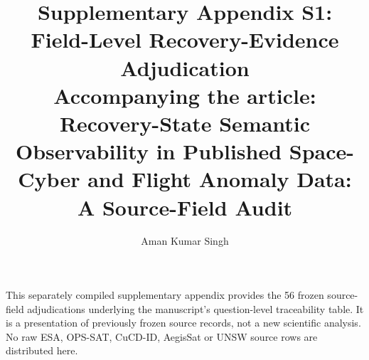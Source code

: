 \documentclass[11pt]{article}
\title{Supplementary Appendix S1: Field-Level Recovery-Evidence Adjudication\\
\large Accompanying the article: Recovery-State Semantic Observability in Published Space-Cyber and Flight Anomaly Data: A Source-Field Audit}
\author{Aman Kumar Singh}
\date{}
\begin{document}
\maketitle
\noindent This separately compiled supplementary appendix provides the 56 frozen source-field adjudications underlying the manuscript's question-level traceability table. It is a presentation of previously frozen source records, not a new scientific analysis. No raw ESA, OPS-SAT, CuCD-ID, AegisSat or UNSW source rows are distributed here.

\end{document}

